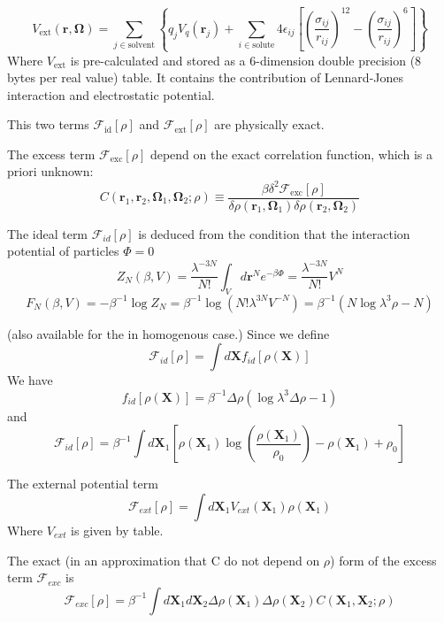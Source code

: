 \begin{equation}
V_{\mathrm{ext}}(\mathbf{r},\mathbf{\mathbf{\mathbf{\mathbf{\Omega}}}})=\sum_{j\in\mathrm{solvent}}\left\{ q_{j}V_{q}(\mathbf{r}_{j})+\sum_{i\in\mathrm{solute}}4\epsilon_{ij}\left[\left(\frac{\sigma_{ij}}{r_{ij}}\right)^{12}-\left(\frac{\sigma_{ij}}{r_{ij}}\right)^{6}\right]\right\} 
\end{equation}
Where $V_{\mathrm{ext}}$ is pre-calculated and stored as a 6-dimension
double precision (8 bytes per real value) table. It contains the contribution
of Lennard-Jones interaction and electrostatic potential. 

This two terms $\mathcal{F}_{\mathrm{id}}[\rho]$ and $\mathcal{F}_{\mathrm{ext}}[\rho]$
are physically exact. 

The excess term $\mathcal{F}_{\mathrm{exc}}[\rho]$ depend on the
exact correlation function, which is a priori unknown: 
\begin{equation}
C(\mathbf{r}_{1},\mathbf{r}_{2},\mathbf{\Omega}_{1},\mathbf{\Omega}_{2};\rho)\equiv\frac{\beta\delta^{2}\mathcal{F}_{\mathrm{exc}}[\rho]}{\delta\rho(\mathbf{r}_{1},\mathbf{\Omega}_{1})\delta\rho(\mathbf{r}_{2},\mathbf{\Omega}_{2})}
\end{equation}


The ideal term $\mathcal{F}_{id}[\rho]$ is deduced from the condition
that the interaction potential of particles $\Phi=0$ 
\[
Z_{N}(\beta,V)=\frac{\lambda^{-3N}}{N!}\int_{V}d\mathbf{r}^{N}e^{-\beta\Phi}=\frac{\lambda^{-3N}}{N!}V^{N}
\]
\[
F_{N}(\beta,V)=-\beta^{-1}\log{Z_{N}}=\beta^{-1}\log{(N!\lambda^{3N}V^{-N})}=\beta^{-1}(N\log{\lambda^{3}\rho}-N)
\]


(also available for the in homogenous case.) Since we define 
\[
\mathcal{F}_{id}[\rho]=\int d\mathbf{X}f_{id}[\rho(\mathbf{X})]
\]
We have 
\[
f_{id}[\rho(\mathbf{X})]=\beta^{-1}\Delta\rho(\log{\lambda^{3}\Delta\rho}-1)
\]
and 
\[
\mathcal{F}_{id}[\rho]=\beta^{-1}\int d\mathbf{X}_{1}[\rho(\mathbf{X}_{1})\log{(\frac{\rho(\mathbf{X}_{1})}{\rho_{0}})}-\rho(\mathbf{X}_{1})+\rho_{0}]
\]


The external potential term 
\[
\mathcal{F}_{ext}[\rho]=\int d\mathbf{X}_{1}V_{ext}(\mathbf{X}_{1})\rho(\mathbf{X}_{1})
\]
Where $V_{ext}$ is given by table.

The exact (in an approximation that C do not depend on $\rho$) form
of the excess term $\mathcal{F}_{exc}$ is 
\[
\mathcal{F}_{exc}[\rho]=\beta^{-1}\int d\mathbf{X}_{1}d\mathbf{X}_{2}\Delta\rho(\mathbf{X}_{1})\Delta\rho(\mathbf{X}_{2})C(\mathbf{X}_{1},\mathbf{X}_{2};\rho)
\]


